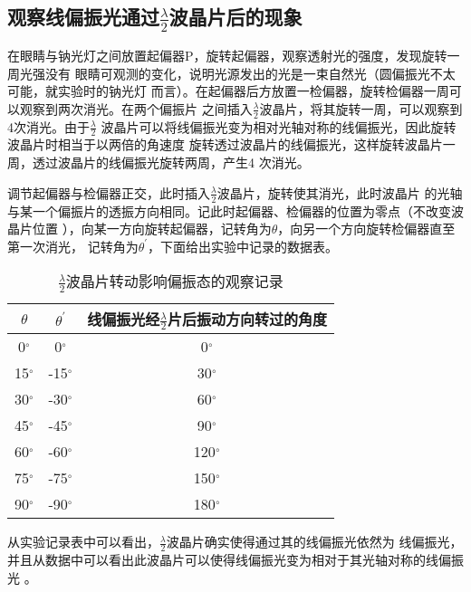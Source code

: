 \documentclass[a4paper]{ctexart}
\def\degree{$^{\circ}$}
\begin{document}
    \subsection{观察线偏振光通过$\frac{\lambda}{2}$波晶片后的现象}
    \par 
    在眼睛与钠光灯之间放置起偏器P，旋转起偏器，观察透射光的强度，发现旋转一周光强没有
    眼睛可观测的变化，说明光源发出的光是一束自然光（圆偏振光不太可能，就实验时的钠光灯
    而言）。在起偏器后方放置一检偏器，旋转检偏器一周可以观察到两次消光。在两个偏振片
    之间插入$\frac{\lambda}{2}$波晶片，将其旋转一周，可以观察到4次消光。由于$\frac{\lambda}{2}$
    波晶片可以将线偏振光变为相对光轴对称的线偏振光，因此旋转波晶片时相当于以两倍的角速度
    旋转透过波晶片的线偏振光，这样旋转波晶片一周，透过波晶片的线偏振光旋转两周，产生4
    次消光。
    \par 
    调节起偏器与检偏器正交，此时插入$\frac{\lambda}{2}$波晶片，旋转使其消光，此时波晶片
    的光轴与某一个偏振片的透振方向相同。记此时起偏器、检偏器的位置为零点（不改变波晶片位置
    ），向某一方向旋转起偏器，记转角为$\theta$，向另一个方向旋转检偏器直至第一次消光，
    记转角为$\theta^{'}$，下面给出实验中记录的数据表。
    \begin{table}[htbp]
        \centering
        \caption{$\frac{\lambda}{2}$波晶片转动影响偏振态的观察记录}
        \begin{tabular}{ccc}
            \toprule[1.5pt]
            $\theta$ & $\theta^{'}$ & 线偏振光经$\frac{\lambda}{2}$片后振动方向转过的角度 \\
            \midrule
            0\degree & 0\degree & 0\degree \\
            15\degree & -15\degree & 30\degree \\
            30\degree & -30\degree & 60\degree \\
            45\degree & -45\degree & 90\degree \\
            60\degree & -60\degree & 120\degree \\
            75\degree & -75\degree & 150\degree \\
            90\degree & -90\degree & 180\degree \\
            \bottomrule[1.5pt]
        \end{tabular}
    \end{table}
    \par 
    从实验记录表中可以看出，$\frac{\lambda}{2}$波晶片确实使得通过其的线偏振光依然为
    线偏振光，并且从数据中可以看出此波晶片可以使得线偏振光变为相对于其光轴对称的线偏振光
    。
\end{document}
